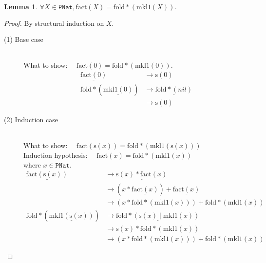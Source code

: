 \documentclass[12pt, a4paper]{article}
\newtheorem{lemma}[theorem]{Lemma}
\newcommand{\rel}[1]{\mathrel{#1}}
\newcommand{\rmx}[1]{\mathrm{#1}}
\newcommand{\larrow}{\longrightarrow}
\newcommand{\under}{\underline}
\begin{document}
\begin{lemma}
\label{lm1}
$\forall X \in \mathtt{PNat}, \rmx{fact}(X) = \rmx{fold*}(\rmx{mkl1}(X))$.
\end{lemma}
\begin{proof}
By structural induction on $X$.

\begin{description}

\item[(1) Base case]~\\
\noindent
What to show: $\quad\rmx{fact}(0) = \rmx{fold*}(\rmx{mkl1}(0))$.
\begin{align*}
\under{\rmx{fact}(0)}
	&\larrow \rmx{s}(0) \tag{by fact1} \\
\rmx{fold*}(\under{\rmx{mkl1}(0)})
	&\larrow \under{\rmx{fold*}(nil)} \tag{by mkl1-1} \\
	&\larrow \rmx{s}(0) \tag{by fold*-1}
\end{align*}

\item[(2) Induction case]~\\
What to show: $\quad\rmx{fact}(\rmx{s}(x)) = \rmx{fold*}(\rmx{mkl1}(\rmx{s}(x)))$ \\
Induction hypothesis: $\quad\rmx{fact}(x) = \rmx{fold*}(\rmx{mkl1}(x))$  \\
where $x \in \mathtt{PNat}$.
\begin{align*}
\under{\rmx{fact}(\rmx{s}(x))} 
	&\larrow \under{\rmx{s}(x) \rel{*} \rmx{fact}(x)} \tag{by fact2} \\
	&\larrow (x \rel{*} \under{\rmx{fact}(x)}) \rel{+} \under{\rmx{fact}(x)} \tag{by *2} \\
	&\larrow (x \rel{*} \rmx{fold*}(\rmx{mkl1}(x))) \rel{+} \rmx{fold*}(\rmx{mkl1}(x)) \tag{by IH} \\
\rmx{fold*}(\under{\rmx{mkl1}(\rmx{s}(x))})
	&\larrow \under{\rmx{fold*}(\rmx{s}(x) \rel{|} \rmx{mkl1}(x))} \tag{by mkl1-2} \\
	&\larrow \rmx{s}(x) \rel{*} \rmx{fold*}(\rmx{mkl1}(x)) \tag{by fold*-2} \\
	&\larrow (x \rel{*} \rmx{fold*}(\rmx{mkl1}(x))) \rel{+} \rmx{fold*}(\rmx{mkl1}(x)) \tag{by *2}
\end{align*}

\end{description}
\end{proof}
\end{document}
